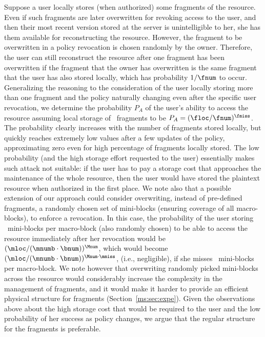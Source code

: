 \medskip
{}
Suppose a user locally stores (when authorized) some fragments of the resource. Even if such fragments are later overwritten for revoking access to the user, and then their most recent version stored at the server is unintelligible to her, she has them available for reconstructing the resource. However, the fragment to be overwritten in a policy revocation is chosen randomly by the owner. Therefore, the user can still reconstruct the resource after one fragment has been overwritten if the fragment that the owner has overwritten is the same fragment that the user has also stored locally, which has probability ${1}/{\fnum}$ to occur. Generalizing the reasoning to the consideration of the user locally storing more than one fragment and the policy naturally changing even after the specific user revocation, we determine the probability $P_A$ of the user's ability to access the resource assuming local storage of \floc\ fragments to be $P_A=(\floc/\fnum)^{\fmiss}$. The probability clearly increases with the number of fragments stored locally, but quickly reaches extremely low values after a few updates of the policy, approximating zero even for high percentage of fragments locally stored. The low probability (and the high storage effort requested to the user) essentially makes such attack not suitable: if the user has to pay a storage cost that approaches the maintenance of the whole resource, then the user would have stored the plaintext resource when authorized in the first place. We note also that a possible extension of our approach could consider overwriting, instead of pre-defined fragments, a randomly chosen set of mini-blocks (ensuring coverage of all macro-blocks), to enforce a revocation. In this case, the probability of the user storing \mloc\ mini-blocks per macro-block (also randomly chosen) to be able to access the resource immediately after her revocation would be $(\mloc/(\mnumb\cdot\bnum))^{\Mnum}$, which would become $(\mloc/(\mnumb\cdot\bnum))^{\Mnum\cdot \mmiss}$, (i.e., negligible), if she misses \mmiss\ mini-blocks per macro-block. We note however that overwriting randomly picked mini-blocks across the resource would considerably increase the complexity in the management of fragments, and it would make it harder to provide an efficient physical structure for fragments (Section~\ref{ms:sec:expe}). Given the observations above about the high storage cost that would be required to the user and the low probability of her success as policy changes, we argue that the regular structure for the fragments is preferable.

